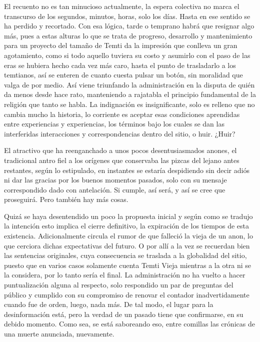 \documentclass[
]{book}
\begin{document}
El recuento no es tan minucioso actualmente, la espera colectiva no marca el transcurso de los segundos, minutos, horas, solo los días. Hasta en ese sentido se ha perdido y recortado. Con esa lógica, tarde o temprano habrá que resignar algo más, pues a estas alturas lo que se trata de progreso, desarrollo y mantenimiento para un proyecto del tamaño de Temti da la impresión que conlleva un gran agotamiento, como si todo aquello tuviera su costo y asumirlo con el paso de las eras se hubiera hecho cada vez más caro, hasta el punto de trasladarlo a los temtianos, así se enteren de cuanto cuesta pulsar un botón, sin moralidad que valga de por medio. Así viene triunfando la administración en la disputa de quién da menos desde hace rato, manteniendo a rajatabla el principio fundamental de la religión que tanto se habla. La indignación es insignificante, solo es relleno que no cambia mucho la historia, lo corriente es aceptar esas condiciones aprendidas entre experiencias y experiencias, los términos bajo los cuales se dan las interferidas interacciones y correspondencias dentro del sitio, o huir. ¿Huir?

El atractivo que ha reenganchado a unos pocos desentusiasmados anones, el tradicional antro fiel a los orígenes que conservaba las pizcas del lejano antes restantes, según lo estipulado, en instantes se estaría despidiendo sin decir adiós ni dar las gracias por los buenos momentos pasados, solo con su mensaje correspondido dado con antelación. Si cumple, así será, y así se cree que proseguirá. Pero también hay más cosas.

Quizá se haya desentendido un poco la propuesta inicial y según como se tradujo la intención esto implica el cierre definitivo, la expiración de los tiempos de esta existencia. Adicionalmente circula el rumor de que falleció la vieja de un anon, lo que cerciora dichas expectativas del futuro. O por allí a la vez se recuerdan bien las sentencias originales, cuya consecuencia se traslada a la globalidad del sitio, puesto que en varios casos solamente cuenta Temti Vieja mientras a la otra ni se la considera, por lo tanto sería el final. La administración no ha vuelto a hacer puntualización alguna al respecto, solo respondido un par de preguntas del público y cumplido con su compromiso de renovar el contador inadvertidamente cuando fue de orden, luego, nada más. De tal modo, el lugar para la desinformación está, pero la verdad de un pasado tiene que confirmarse, en su debido momento. Como sea, se está saboreando eso, entre comillas las crónicas de una muerte anunciada, nuevamente.
\end{document}
